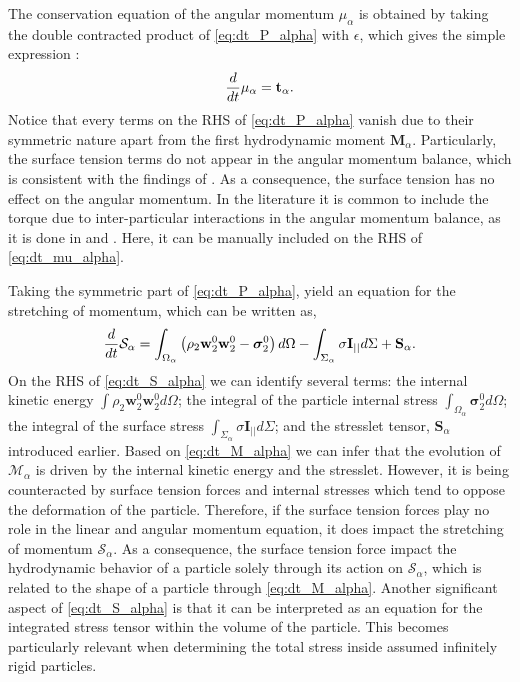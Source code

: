 The conservation equation of the angular momentum $\mu_\alpha$ is obtained by taking the double contracted product of \ref{eq:dt_P_alpha} with $\epsilon$, which gives the simple expression :
\begin{equation}
    \frac{d}{d t}\mu_\alpha
    =  
    \textbf{t}_\alpha.
    \label{eq:dt_mu_alpha}
\end{equation}
Notice that every terms on the RHS of \ref{eq:dt_P_alpha} vanish due to their symmetric nature apart from the first hydrodynamic moment $\textbf{M}_\alpha$.
Particularly, the surface tension terms do not appear in the angular momentum balance, which is consistent with the findings of \citet{hesla1993note}. 
As a consequence, the surface tension has no effect on the angular momentum. 
In the literature it is common to include the torque due to inter-particular interactions in the angular momentum balance, as it is done in \citet{jackson1997locally} and \citet{zhang1997momentum}.
Here, it can be manually included on the RHS of \ref{eq:dt_mu_alpha}. 


Taking the symmetric part of \ref{eq:dt_P_alpha}, yield an equation for the stretching of momentum, which can be written as,
\begin{equation}    
    \frac{d}{d t} \mathcal{S}_\alpha
    =  \int_{\Omega_\alpha} \left(
        \rho_2\textbf{w}_2^0 \textbf{w}_2^0
        - \bm{\sigma}_2^0
        \right) d\Omega
        - \int_{\Sigma_\alpha} 
        \sigma \textbf{I}_{||}
        d\Sigma
        + \textbf{S}_\alpha.
    \label{eq:dt_S_alpha}
\end{equation}
On the RHS of \ref{eq:dt_S_alpha} we can identify several terms: 
the internal kinetic energy $\int \rho_2\textbf{w}_2^0\textbf{w}_2^0 d\Omega$; 
the integral of the particle internal stress $\int_{\Omega_\alpha} \bm{\sigma}_2^0
 d\Omega$; 
the integral of the surface stress $\int_{\Sigma_\alpha} \sigma \textbf{I}_{||} d\Sigma$; 
and the stresslet tensor, $\textbf{S}_\alpha$ introduced earlier.
Based on \ref{eq:dt_M_alpha} we can infer that the evolution of $\mathcal{M}_\alpha$ is driven by the internal kinetic energy and the stresslet.
However, it is being counteracted by surface tension forces and internal stresses which tend to oppose the deformation of the particle. 
Therefore, if the surface tension forces play no role in the linear and angular momentum equation, it does impact the stretching of momentum $\mathcal{S}_\alpha$.
As a consequence, the surface tension force impact the hydrodynamic behavior of a particle solely through its action on $\mathcal{S}_\alpha$, which is related to the shape of a particle through \ref{eq:dt_M_alpha}.
Another significant aspect of \ref{eq:dt_S_alpha} is that it can be interpreted as an equation for the integrated stress tensor within the volume of the particle.
This becomes particularly relevant when determining the total stress inside assumed infinitely rigid particles. 


